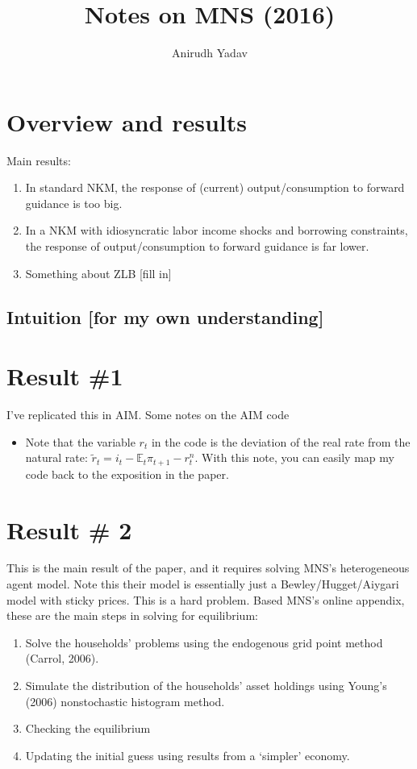 \documentclass[12pt]{article}
\title{Notes on MNS (2016)}
\author{Anirudh Yadav}
\newcommand{\E}{\mathbb{E}}
\begin{document}
\maketitle



\section{Overview and results}
Main results:
\begin{enumerate}
\item In standard NKM, the response of (current) output/consumption to forward guidance is too big.
\item In a NKM with idiosyncratic labor income shocks and borrowing constraints, the response of output/consumption to forward guidance is far lower.
\item Something about ZLB [fill in]
\end{enumerate}

\subsection{Intuition [for my own understanding]}

\section{Result \#1}
I've replicated this in AIM. Some notes on the AIM code
\begin{itemize}
\item Note that the variable $r_t$ in the code is the deviation of the real rate from the natural rate: $\tilde r_t = i_t -\E_t\pi_{t+1} - r^n_t$. With this note, you can easily map my code back to the exposition in the paper.
\end{itemize}

\section{Result \# 2}
This is the main result of the paper, and it requires solving MNS's heterogeneous agent model. Note this their model is essentially just a Bewley/Hugget/Aiygari model with sticky prices. This is a hard problem. Based MNS's online appendix, these are the main steps in solving for equilibrium:

\begin{enumerate}
\item Solve the households' problems using the endogenous grid point method (Carrol, 2006).
\item Simulate the distribution of the households' asset holdings using Young's (2006) nonstochastic histogram method.
\item Checking the equilibrium
\item Updating the initial guess using results from a `simpler' economy.
\end{enumerate}
\end{document}
